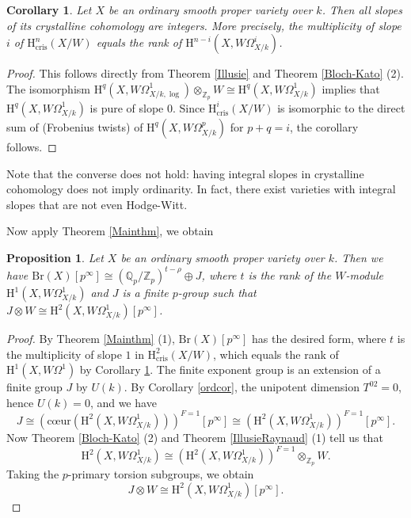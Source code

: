 \documentclass[a4paper,12pt,twoside]{report}
\newtheorem{proposition}[theorem]{Proposition}
\newtheorem{corollary}[theorem]{Corollary}
\newcommand{\Q}{\mathbb{Q}}
\newcommand{\Z}{\mathbb{Z}}
\newcommand{\cris}{\mathrm{cris}}
\newcommand{\Br}{\mathrm{Br}}
\newcommand{\HH}{\mathrm{H}}
\begin{document}
\medskip

\begin{corollary}\label{slopeint}
    Let $X$ be an ordinary smooth proper variety over $k$. 
    Then all slopes of its crystalline cohomology are integers. 
    More precisely, the multiplicity of slope $i$ of $\HH^n_{\cris}(X/W)$ 
    equals the rank of $\HH^{n-i}(X,W\Omega_{X/k}^i)$. 
\end{corollary}
\begin{proof}
    This follows directly from Theorem \ref{Illusie} and Theorem \ref{Bloch-Kato} (2). 
    The isomorphism $\HH^q(X,W\Omega_{X/k,\log}^1) \otimes_{\Z_p} W \cong \HH^q(X,W\Omega_{X/k}^1)$
    implies that $\HH^q(X,W\Omega_{X/k}^1)$ is pure of slope $0$. Since
    $\HH^i_{\cris}(X/W)$ is isomorphic to the direct sum of 
    (Frobenius twists) of $\HH^q(X,W\Omega_{X/k}^p)$ for $p+q=i$, the corollary follows.
\end{proof} 

Note that the converse does not hold: having integral slopes in crystalline cohomology does not imply ordinarity. In fact, there exist varieties with integral slopes that are not even Hodge-Witt.

Now apply Theorem \ref{Mainthm}, we obtain

\begin{proposition}\label{Ordinary}
    Let $X$ be an ordinary smooth proper variety over $k$. Then we have
    $\Br(X)[p^\infty]\cong (\Q_p/\Z_p)^{t-\rho}\oplus J$,
    where $t$ is the rank of the $W$-module 
$\HH^1(X,W\Omega_{X/k}^1)$ and $J$ is a finite $p$-group such that 
    $J\otimes W \cong \HH^2(X,W\Omega_{X/k}^1)[p^{\infty}]$.
\end{proposition}
\begin{proof}
By Theorem \ref{Mainthm} (1), $\Br(X)[p^\infty]$ has the desired form, 
where $t$ is the multiplicity of slope $1$ in $\HH^2_{\cris}(X/W)$,
which equals the rank of $\HH^1(X,W\Omega^1)$ by Corollary \ref{slopeint}.
The finite exponent group is an extension of a finite group $J$ by $U(k)$. 
By Corollary \ref{ordcor}, the unipotent dimension $T^{02}=0$, hence $U(k)=0$,
and we have
$$J\cong (\text{c\oe ur}(\HH^2(X,W\Omega^1_{X/k})))^{F=1}[p^{\infty}] \cong (\HH^2(X,W\Omega^1_{X/k}))^{F=1}[p^{\infty}].$$ 
Now Theorem \ref{Bloch-Kato} (2) and Theorem \ref{IllusieRaynaud} (1)  tell us that  \[\HH^2(X,W\Omega^1_{X/k})\cong (\HH^2(X,W\Omega^1_{X/k}))^{F=1}\otimes_{\Z_p}W.\]
Taking the $p$-primary torsion subgroups, we obtain \[J\otimes W \cong \HH^2(X,W\Omega^1_{X/k})[p^{\infty}].\] 
\end{proof}
\end{document}
